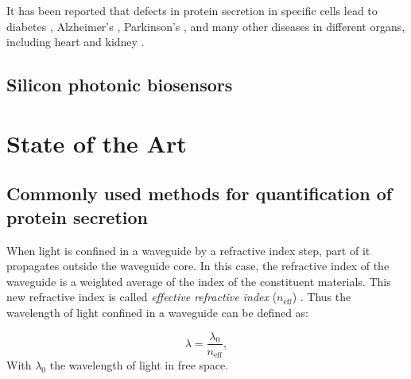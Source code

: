 \documentclass[12pt,a4paper]{report}
\begin{document}
It has been reported that defects in protein secretion in specific cells lead to diabetes \cite{abe11:531}, Alzheimer's \cite{tampellini11:15384}, Parkinson's \cite{luk12:949}, and many other diseases in different organs, including heart and kidney \cite{doroudgar11:207, jena05:307}.%


\section{Silicon photonic biosensors}
\label{section:biosens} %


\chapter{State of the Art}
\label{chap:stateart}

\section{Commonly used methods for quantification of protein secretion}

When light is confined in a waveguide by a refractive index step, part of it propagates outside the waveguide core. In this case, the refractive index of the waveguide is a weighted average of the index of the constituent materials. This new refractive index is called \emph{effective refractive index} ($n_\text{eff}$) \cite{Gylfason10}. Thus the wavelength of light confined in a waveguide can be defined as:


\begin{equation}
   \lambda=\frac{\lambda_0}{n_\text{eff}},
   \label{eq:wave}
\end{equation}
With $\lambda_0$ the wavelength of light in free space.
\end{document}
